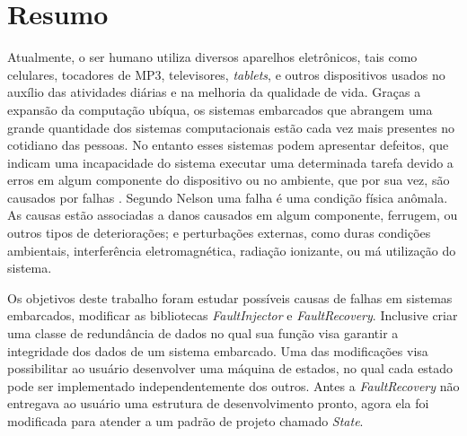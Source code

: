 
\chapter*{Resumo}

Atualmente, o ser humano utiliza diversos aparelhos eletrônicos, tais como celulares, tocadores de MP3, televisores, \textit{tablets}, e outros dispositivos usados no auxílio das atividades diárias e na melhoria da qualidade de vida. Graças a expansão da computação ubíqua, os sistemas embarcados que abrangem uma grande quantidade dos sistemas computacionais estão cada vez mais presentes no cotidiano das pessoas. No entanto esses sistemas podem apresentar defeitos, que indicam uma incapacidade do sistema executar uma determinada tarefa devido a erros em algum componente do dispositivo ou no ambiente, que por sua vez, são causados por falhas \cite{Nelson:1990}. Segundo Nelson \cite{Nelson:1990} uma falha é uma condição física anômala. As causas estão associadas a danos causados em algum componente, ferrugem, ou outros tipos de deteriorações; e perturbações externas, como duras condições ambientais, interferência eletromagnética, radiação ionizante, ou má utilização do sistema.

Os objetivos deste trabalho foram estudar possíveis causas de falhas em sistemas embarcados, modificar as bibliotecas \textit{FaultInjector} e \textit{FaultRecovery}. Inclusive criar uma classe de redundância de dados no qual sua função visa garantir a integridade dos dados de um sistema embarcado. Uma das modificações visa possibilitar ao usuário desenvolver uma máquina de estados, no qual cada estado pode ser implementado independentemente dos outros. Antes a \textit{FaultRecovery} não entregava ao usuário uma estrutura de desenvolvimento pronto, agora ela foi modificada para atender a um padrão de projeto chamado \textit{State}.

